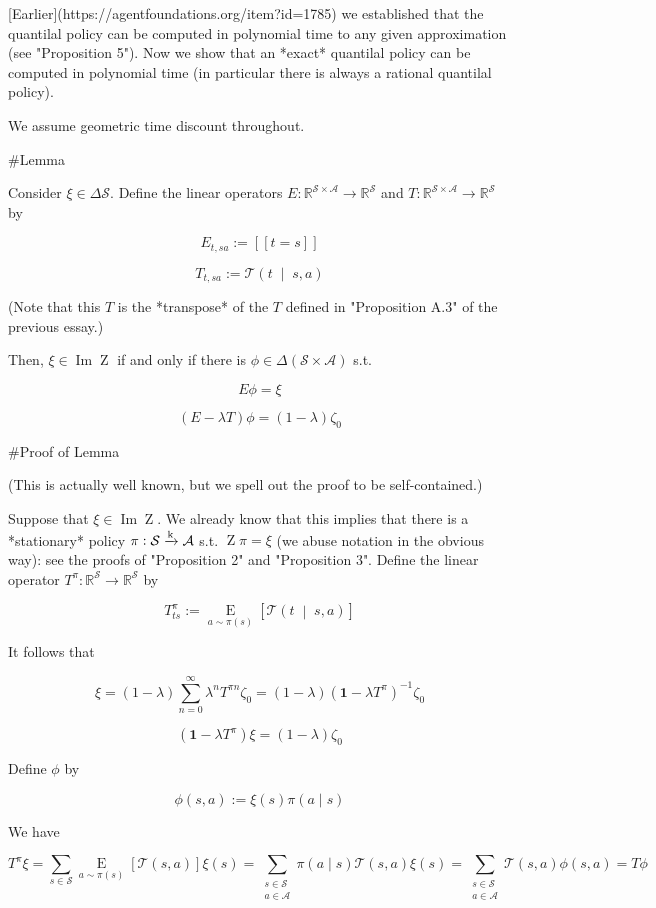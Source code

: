 \documentclass[a4paper]{article}
\DeclareMathOperator{\Img}{Im}
\newcommand{\AP}[1]{\left(#1\right)}
\newcommand{\AB}[1]{\left[#1\right]}
\newcommand{\APM}[2]{\left(#1\;\middle\vert\;#2\right)}
\newcommand{\Ea}[2]{\underset{#1}{\operatorname{E}}\AB{#2}}
\newcommand{\Reals}{\mathbb{R}}
\newcommand{\K}{\xrightarrow{\textnormal{k}}}
\newcommand{\A}{\mathcal{A}}
\newcommand{\St}{\mathcal{S}}
\newcommand{\T}{\mathcal{T}}
\DeclareMathOperator{\Z}{Z}
\begin{document}
[Earlier](https://agentfoundations.org/item?id=1785) we established that the quantilal policy can be computed in polynomial time to any given approximation (see "Proposition 5"). Now we show that an *exact* quantilal policy can be computed in polynomial time (in particular there is always a rational quantilal policy).

We assume geometric time discount throughout.

\#Lemma

Consider $\xi \in \Delta\St$. Define the linear operators $E: \Reals^{\St \times \A} \rightarrow \Reals^\St$ and $T: \Reals^{\St \times \A} \rightarrow \Reals^\St$ by

$$E_{t,sa} := [[t = s]]$$

$$T_{t,sa} := \T\APM{t}{s,a}$$

(Note that this $T$ is the *transpose* of the $T$ defined in "Proposition A.3" of the previous essay.)

Then, $\xi \in \Img{\Z}$ if and only if there is $\phi \in \Delta(\St\times\A)$ s.t.

$$E\phi = \xi$$

$$(E-\lambda T) \phi = (1-\lambda)\zeta_0$$

\#Proof of Lemma

(This is actually well known, but we spell out the proof to be self-contained.)

Suppose that $\xi \in \Img{\Z}$. We already know that this implies that there is a *stationary* policy $\pi:\St\K\A$ s.t. $\Z\pi = \xi$ (we abuse notation in the obvious way): see the proofs of "Proposition 2" and "Proposition 3". Define the linear operator $T^\pi: \Reals^\St \rightarrow \Reals^\St$ by

$$T_{ts}^\pi := \Ea{a\sim\pi(s)}{\T\APM{t}{s,a}}$$

It follows that 

$$\xi = (1-\lambda)\sum_{n=0}^\infty \lambda^n T^{\pi n} \zeta_0  = (1-\lambda)\AP{\boldsymbol{1}-\lambda T^\pi}^{-1} \zeta_0$$

$$\AP{\boldsymbol{1}-\lambda T^\pi}\xi = (1-\lambda)\zeta_0$$

Define $\phi$ by

$$\phi(s,a) := \xi(s) \pi(a \mid s)$$

We have

$$T^\pi\xi = \sum_{s\in\St} \Ea{a\sim\pi(s)}{\T(s,a)} \xi(s) = \sum_{\substack{s\in\St\\a\in\A}}\pi(a \mid s)\T(s,a)\xi(s) = \sum_{\substack{s\in\St\\a\in\A}} \T(s,a) \phi(s,a) = T\phi$$
\end{document}
